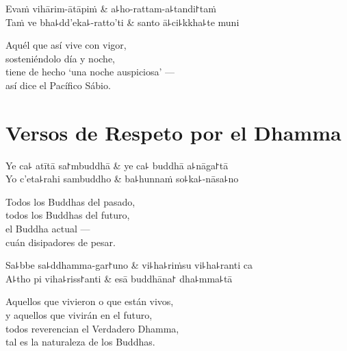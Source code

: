 \clearpage

\begin{twochants}
  Evaṁ vihārim-ātāpiṁ & a꜕ho-rattam-a꜕tandi꜓taṁ \\
  Taṁ ve bha꜕dd'eka꜕-ratto'ti & santo ā꜕ci꜕kkha꜕te muni \\
\end{twochants}

\begin{english}
  Aquél que así vive con vigor,\\
  sosteniéndolo día y noche,\\
  tiene de hecho `una noche auspiciosa' ---\\
  así dice el Pacífico Sábio.
\end{english}

\chapter{Versos de Respeto por el Dhamma}


\begin{leader}
\end{leader}

\begin{twochants}
  Ye ca꜕ atītā sa꜓mbuddhā & ye ca꜕ buddhā a꜕nāga꜓tā \\
  Yo c'eta꜕rahi sambuddho & ba꜕hunnaṁ so꜕ka꜕-nāsa꜕no \\
\end{twochants}

\begin{english}
  Todos los Buddhas del pasado,\\
  todos los Buddhas del futuro,\\
  el Buddha actual ---\\
  cuán disipadores de pesar.
\end{english}

\begin{twochants}
  Sa꜕bbe sa꜕ddhamma-gar꜓uno & vi꜕ha꜕riṁsu vi꜕ha꜕ranti ca \\
  A꜕tho pi viha꜕riss꜓anti & esā buddhāna꜓ dha꜕mma꜕tā \\
\end{twochants}

\begin{english}
  Aquellos que vivieron o que están vivos,\\
  y aquellos que vivirán en el futuro,\\
  todos reverencian el Verdadero Dhamma,\\
  tal es la naturaleza de los Buddhas.
\end{english}

